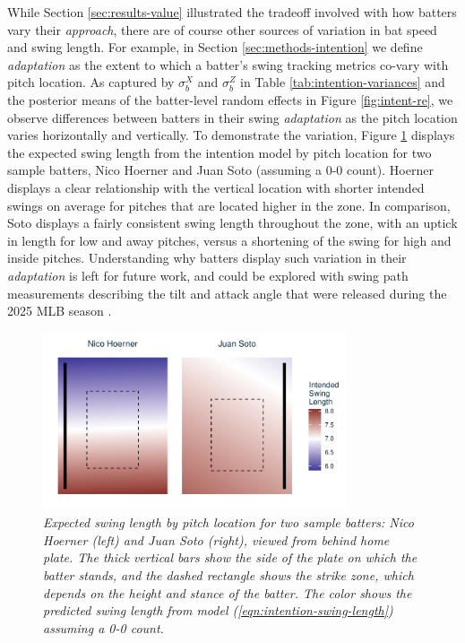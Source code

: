 \documentclass[
  12pt]{article}
\begin{document}
    While Section \ref{sec:results-value} illustrated the tradeoff involved with how batters vary their \textit{approach}, there are of course other sources of variation in bat speed and swing length. For example, in Section \ref{sec:methods-intention} we define \textit{adaptation} as the extent to which a batter's swing tracking metrics co-vary with pitch location. As captured by $\sigma_b^X$ and $\sigma_b^Z$ in Table \ref{tab:intention-variances} and the posterior means of the batter-level random effects in Figure \ref{fig:intent-re}, we observe differences between batters in their swing \textit{adaptation} as the pitch location varies horizontally and vertically. To demonstrate the variation, Figure \ref{fig:adaptation} displays the expected swing length from the intention model by pitch location for two sample batters, Nico Hoerner and Juan Soto (assuming a 0-0 count). Hoerner displays a clear relationship with the vertical location with shorter intended swings on average for pitches that are located higher in the zone. In comparison, Soto displays a fairly consistent swing length throughout the zone, with an uptick in length for low and away pitches, versus a shortening of the swing for high and inside pitches. Understanding why batters display such variation in their \textit{adaptation} is left for future work, and could be explored with swing path measurements describing the tilt and attack angle that were released during the 2025 MLB season \citep{petriello_4_2025}.
    
      \begin{figure}
        \centering
        \includegraphics[width = 0.8\textwidth]{../../figures/adaptation.pdf}
        \caption{\it Expected swing length by pitch location for two sample batters: Nico Hoerner (left) and Juan Soto (right), viewed from behind home plate. The thick vertical bars show the side of the plate on which the batter stands, and the dashed rectangle shows the strike zone, which depends on the height and stance of the batter. The color shows the predicted swing length  from model (\ref{eqn:intention-swing-length}) assuming a 0-0 count.}
        \label{fig:adaptation}
      \end{figure}
\end{document}
